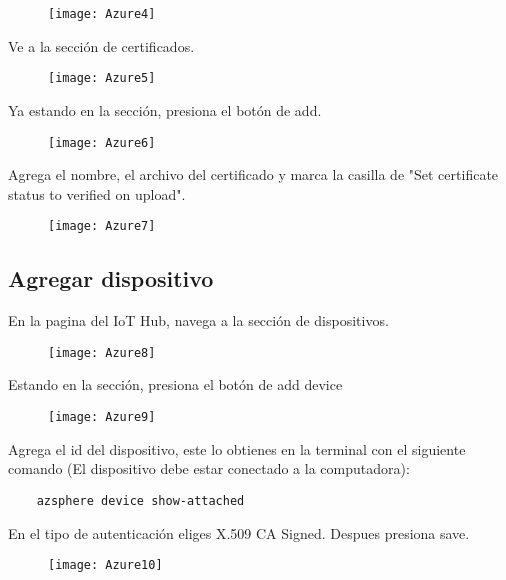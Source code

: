 \begin{figure}[h]
	\centering
	\texttt{[image: Azure4]}
\end{figure}
\pagebreak
Ve a la sección de certificados.
\begin{figure}[h]
	\centering
	\texttt{[image: Azure5]}
\end{figure}

Ya estando en la sección, presiona el botón de add.
\begin{figure}[h]
	\centering
	\texttt{[image: Azure6]}
\end{figure}
\pagebreak

Agrega el nombre, el archivo del certificado y marca la casilla de "Set certificate status to verified on upload".
\begin{figure}[h]
	\centering
	\texttt{[image: Azure7]}
\end{figure}
\subsection{Agregar dispositivo}
En la pagina del IoT Hub, navega a la sección de dispositivos.
\begin{figure}[h]
	\centering
	\texttt{[image: Azure8]}
\end{figure}

Estando en la sección, presiona el botón de add device
\begin{figure}[h]
	\centering
	\texttt{[image: Azure9]}
\end{figure}
\pagebreak

Agrega el id del dispositivo, este lo obtienes en la terminal con el siguiente comando (El dispositivo debe estar conectado a la computadora):
\begin{verbatim}
	azsphere device show-attached
\end{verbatim}
En el tipo de autenticación eliges X.509 CA Signed. Despues presiona save.
\begin{figure}[h]
	\centering
	\texttt{[image: Azure10]}
\end{figure}
